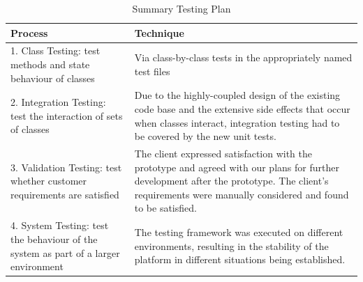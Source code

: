 \documentclass[11pt,a4paper]{article}
\begin{document}
\begin{table}[h!]
    \centering
    \caption{Summary Testing Plan}
    \begin{tabular}[t]{|p{8cm}|p{7cm}|} \hline
        \textbf{Process} & \textbf{Technique} \\
        \hline 1. Class Testing: test methods and state behaviour of classes
                         & Via class-by-class tests in the appropriately named
                         test files\\
        \hline 2. Integration Testing: test the interaction of sets of classes
                            & Due to the highly-coupled design of the existing
                            code base and the extensive side effects that occur when
                            classes interact, integration testing had to be
                            covered by the new unit tests.\\
        \hline 3. Validation Testing: test whether customer requirements are
        satisfied
                            & The client expressed satisfaction with the
                            prototype and agreed with our plans for further
                            development after the prototype. The client's
                            requirements were manually considered and found to
                            be satisfied.\\
        \hline 4. System Testing: test the behaviour of the system as part of a
        larger environment
                            &  The testing framework was executed on different
                            environments, resulting in the stability of the
                            platform in different situations being established.\\
        \hline
    \end{tabular}
    \label{tab:test-plan}
\end{table}
\end{document}
